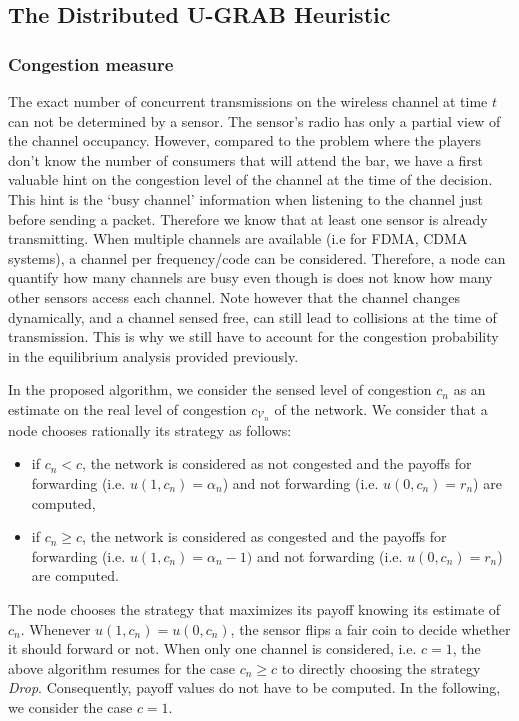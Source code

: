 \documentclass[journal, peerreview, onecolumn, draftcls]{IEEEtran}
\begin{document}
\subsection{The Distributed U-GRAB Heuristic}

\subsubsection{Congestion measure}
The exact number of concurrent transmissions on the wireless channel at time $t$ can not be determined by a sensor. The sensor's radio has only a partial view of the channel occupancy. However, compared to the problem where the players don't know the number of consumers that will attend the bar, we have a first valuable hint on the congestion level of the channel at the time of the decision. This hint is the `busy channel' information when listening to the channel just before sending a packet. Therefore we know that at least one sensor is already transmitting. When multiple channels are available (i.e for FDMA, CDMA systems), a channel per frequency/code can be considered. Therefore, a node can quantify how many channels are busy even though is does not know how many other sensors access each channel. Note however that the channel changes dynamically, and a channel sensed free, can still lead to collisions at the time of transmission. This is why we still have to account for the congestion probability in the equilibrium analysis provided previously.

In the proposed algorithm, we consider the sensed level of congestion $c_n$ as an estimate on the real level of congestion $c_{\mathcal{V}_n}$ of the network. We consider that a node chooses rationally its strategy as follows:
\begin{itemize}
\item if  $c_n  < c$, the network is considered as not congested and the payoffs for forwarding  (i.e. $u(1, c_n) = \alpha_n$) and not forwarding (i.e. $u(0, c_n) = r_n$) are computed,
\item if $c_n \geq c$, the network is considered as congested and the payoffs for forwarding (i.e. $u(1, c_n) =\alpha_n - 1)$ and not forwarding (i.e. $u(0, c_n) = r_n$) are computed.
\end{itemize}
The node chooses the strategy that maximizes its payoff knowing its estimate of $c_n$. Whenever $u(1,c_n)=u(0,c_n)$, the sensor flips a fair coin to decide whether it should forward or not.
When only one channel is considered, i.e. $c=1$, the above algorithm resumes for the case $c_n \geq c$ to directly choosing the strategy {\it Drop}. Consequently, payoff values do not have to be computed. In the following, we consider the case $c=1$.
\end{document}
